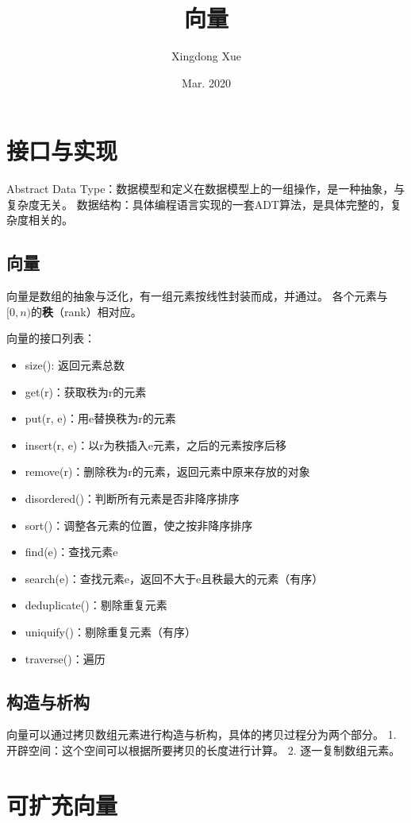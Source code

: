 \documentclass{article}
\title{向量}
\author{Xingdong Xue}
\date{Mar. 2020}
\begin{document}
\maketitle

\section{接口与实现}

Abstract Data Type：数据模型和定义在数据模型上的一组操作，是一种抽象，与复杂度无关。
数据结构：具体编程语言实现的一套ADT算法，是具体完整的，复杂度相关的。

\subsection{向量}

向量是数组的抽象与泛化，有一组元素按线性封装而成，并通过。
各个元素与$[0,n)$的\textbf{秩}（rank）相对应。

向量的接口列表：
\begin{itemize}
  \item size(): 返回元素总数
  \item get(r)：获取秩为r的元素
  \item put(r, e)：用e替换秩为r的元素
  \item insert(r, e)：以r为秩插入e元素，之后的元素按序后移
  \item remove(r)：删除秩为r的元素，返回元素中原来存放的对象
  \item disordered()：判断所有元素是否非降序排序
  \item sort()：调整各元素的位置，使之按非降序排序
  \item find(e)：查找元素e
  \item search(e)：查找元素e，返回不大于e且秩最大的元素（有序）
  \item deduplicate()：剔除重复元素
  \item uniquify()：剔除重复元素（有序）
  \item traverse()：遍历
\end{itemize}

\subsection{构造与析构}

向量可以通过拷贝数组元素进行构造与析构，具体的拷贝过程分为两个部分。
1. 开辟空间：这个空间可以根据所要拷贝的长度进行计算。
2. 逐一复制数组元素。

\section{可扩充向量}
\end{document}
